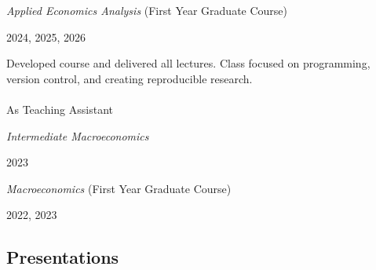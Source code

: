 \documentclass[
  letterpaper,
  DIV=11,
  numbers=noendperiod]{scrartcl}
\makeatletter
\let\oldparagraph\paragraph
\renewcommand{\paragraph}{
    \@ifstar
      \xxxParagraphStar
      \xxxParagraphNoStar
  }
\newcommand{\xxxParagraphStar}[1]{\oldparagraph*{#1}\mbox{}}
\newcommand{\xxxParagraphNoStar}[1]{\oldparagraph{#1}\mbox{}}
\makeatother
\begin{document}
\begin{minipage}{0.7\linewidth}

\emph{Applied Economics Analysis} (First Year Graduate Course)

\end{minipage}\begin{minipage}{0.3\linewidth}\begin{flushright}

2024, 2025, 2026

\end{flushright}\end{minipage}

\vspace{-6pt}\begin{minipage}{\linewidth}

Developed course and delivered all lectures. Class focused on
programming, version control, and creating reproducible research.

\end{minipage}

\paragraph{As Teaching Assistant}\label{as-teaching-assistant}

\begin{minipage}{0.7\linewidth}

\emph{Intermediate Macroeconomics}

\end{minipage}\begin{minipage}{0.3\linewidth}\begin{flushright}

2023

\end{flushright}\end{minipage}

\begin{minipage}{0.7\linewidth}

\emph{Macroeconomics} (First Year Graduate Course)

\end{minipage}\begin{minipage}{0.3\linewidth}\begin{flushright}

2022, 2023

\end{flushright}\end{minipage}

\subsection{Presentations}\vspace{-20pt}\noindent\makebox[\linewidth]{\rule{\textwidth}{0.5pt}}
\end{document}
